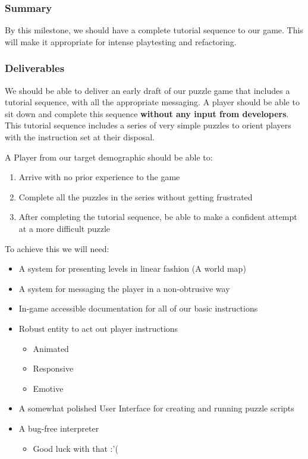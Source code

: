 \subsubsection*{Summary}
By this milestone, we should have a complete tutorial sequence to our game. This
will make it appropriate for intense playtesting and refactoring.

\subsubsection*{Deliverables}
We should be able to deliver an early draft of our puzzle game that includes a
tutorial sequence, with all the appropriate messaging. A player should be able
to sit down and complete this sequence \textbf{without any input from developers}.
This tutorial sequence includes a series of very simple puzzles to orient
players with the instruction set at their disposal.

A Player from our target demographic should be able to:
\begin{enumerate}
  \item Arrive with no prior experience to the game
  \item Complete all the puzzles in the series without getting frustrated
  \item After completing the tutorial sequence, be able to make a confident
  attempt at a more difficult puzzle
\end{enumerate}

To achieve this we will need:
\begin{itemize}
  \item A system for presenting levels in linear fashion (A world map)
  \item A system for messaging the player in a non-obtrusive way
  \item In-game accessible documentation for all of our basic instructions
  \item Robust entity to act out player instructions
  \begin{itemize}
    \item Animated
    \item Responsive
    \item Emotive
  \end{itemize}
  \item A somewhat polished User Interface for creating and running puzzle scripts
  \item A bug-free interpreter
  \begin{itemize}
    \item Good luck with that :’(
  \end{itemize}
\end{itemize}

